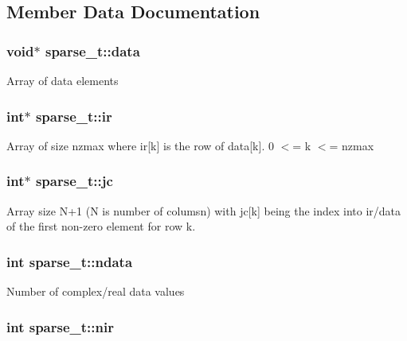 \subsection{\-Member \-Data \-Documentation}
\hypertarget{structsparse__t_a8194f9468a7d77514db5ed70b54017bb}{
\subsubsection[{data}]{\setlength{\rightskip}{0pt plus 5cm}void$\ast$ {\bf sparse\-\_\-t\-::data}}}\label{structsparse__t_a8194f9468a7d77514db5ed70b54017bb}
\-Array of data elements \hypertarget{structsparse__t_ae3b4cd31e90bb824e9b00f7c3dec7af4}{
\subsubsection[{ir}]{\setlength{\rightskip}{0pt plus 5cm}int$\ast$ {\bf sparse\-\_\-t\-::ir}}}\label{structsparse__t_ae3b4cd31e90bb824e9b00f7c3dec7af4}
\-Array of size nzmax where ir\mbox{[}k\mbox{]} is the row of data\mbox{[}k\mbox{]}. 0 $<$= k $<$= nzmax \hypertarget{structsparse__t_aeea61c5d15e5cc015a8baf55cc130ee1}{
\subsubsection[{jc}]{\setlength{\rightskip}{0pt plus 5cm}int$\ast$ {\bf sparse\-\_\-t\-::jc}}}\label{structsparse__t_aeea61c5d15e5cc015a8baf55cc130ee1}
\-Array size \-N+1 (\-N is number of columsn) with jc\mbox{[}k\mbox{]} being the index into ir/data of the first non-\/zero element for row k. \hypertarget{structsparse__t_ab692009004070fda2da8274767a0788d}{
\subsubsection[{ndata}]{\setlength{\rightskip}{0pt plus 5cm}int {\bf sparse\-\_\-t\-::ndata}}}\label{structsparse__t_ab692009004070fda2da8274767a0788d}
\-Number of complex/real data values \hypertarget{structsparse__t_a6aa1a08cc2760a36771edd65df8cf111}{
\subsubsection[{nir}]{\setlength{\rightskip}{0pt plus 5cm}int {\bf sparse\-\_\-t\-::nir}}}\label{structsparse__t_a6aa1a08cc2760a36771edd65df8cf111}
